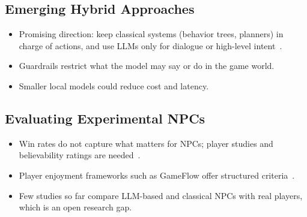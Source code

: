 \subsection{Emerging Hybrid Approaches}
\begin{itemize}
  \item Promising direction: keep classical systems (behavior trees,
        planners) in charge of actions, and use LLMs only for dialogue or
        high-level intent~\cite{gallotta2024}.
  \item Guardrails restrict what the model may say or do in the game
        world.
  \item Smaller local models could reduce cost and latency.
\end{itemize}

\subsection{Evaluating Experimental NPCs}
\begin{itemize}
  \item Win rates do not capture what matters for NPCs; player studies and
        believability ratings are needed~\cite{warpefelt2017,hingston2009}.
  \item Player enjoyment frameworks such as GameFlow offer structured
        criteria~\cite{sweetser2005}.
  \item Few studies so far compare LLM-based and classical NPCs with real
        players, which is an open research gap.
\end{itemize}

